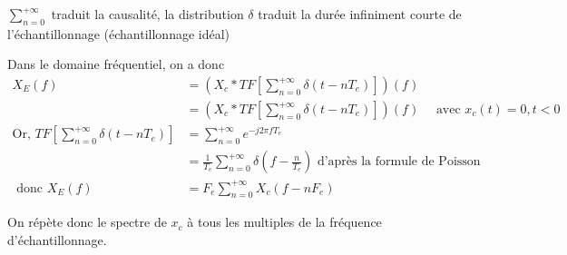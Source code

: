 \documentclass[main.tex]{subfiles}
\newcommand{\snzi}{\sum_{n=0}^{+\infty}}
\newcommand{\snii}{\sum_{n=0}^{+\infty}}
\begin{document}
\begin{rem}
$\snzi$ traduit la causalité, la distribution $\delta$ traduit la durée infiniment courte de l'échantillonnage (échantillonnage idéal)
\end{rem}
\pagebreak
Dans le domaine fréquentiel, on a donc
\begin{align*}
X_E(f) & = (X_c * TF [ \snzi \delta(t-nT_e) ])(f) \\
& = (X_c * TF [ \snii \delta(t-nT_e) ])(f) \quad \text{ avec } x_c(t) = 0 , t <0 \\
\text{Or, } TF [ \snzi \delta(t-nT_e) ] & = \snzi e^{-j2\pi f T_e} \\
&  = \frac{1}{T_e} \snzi \delta(f-\frac{n}{T_e})  \text{ d'après la formule de Poisson} \\
\text{ donc } X_E(f) & = F_e \snii X_c(f-nF_e)
\end{align*}

On répète donc le spectre de $x_c$ à tous les multiples de la fréquence d'échantillonnage.
\end{document}
